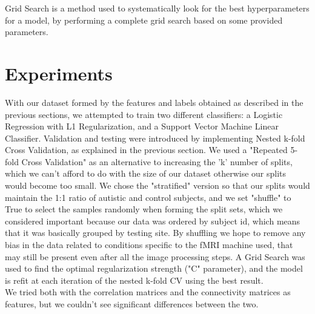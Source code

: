 \documentclass{article}
\begin{document}
Grid Search is a method used to systematically look for the best hyperparameters for a model, by performing a complete grid search based on some provided parameters.

\section{Experiments}

With our dataset formed by the features and labels obtained as described in the previous sections, we attempted to train two different classifiers: a Logistic Regression with L1 Regularization, and a Support Vector Machine Linear Classifier. Validation and testing were introduced by implementing Nested k-fold Cross Validation, as explained in the previous section. We used a "Repeated 5-fold Cross Validation" as an alternative to increasing the 'k' number of splits, which we can't afford to do with the size of our dataset otherwise our splits would become too small. We chose the "stratified" version so that our splits would maintain the 1:1 ratio of autistic and control subjects, and we set "shuffle" to True to select the samples randomly when forming the split sets, which we considered important because our data was ordered by subject id, which means that it was basically grouped by testing site. By shuffling we hope to remove any bias in the data related to conditions specific to the fMRI machine used, that may still be present even after all the image processing steps. A Grid Search was used to find the optimal regularization strength ("C" parameter), and the model is refit at each iteration of the nested k-fold CV using the best result. \\
We tried both with the correlation matrices and the connectivity matrices as features, but we couldn't see significant differences between the two.
\end{document}
